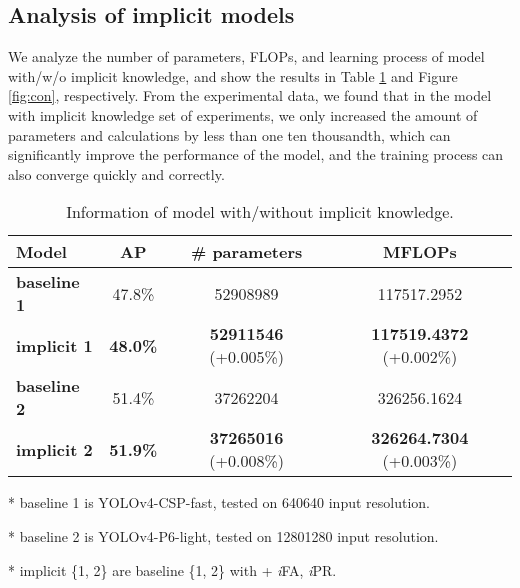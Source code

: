 \documentclass[10pt,twocolumn,letterpaper]{article}
\begin{document}
\subsection{Analysis of implicit models}
\label{sec:an}

We analyze the number of parameters, FLOPs, and learning process of model with/w/o implicit knowledge, and show the results in Table \ref{table:pf} and Figure \ref{fig:con}, respectively. From the experimental data, we found that in the model with implicit knowledge set of experiments, we only increased the amount of parameters and calculations by less than one ten thousandth, which can significantly improve the performance of the model, and the training process can also converge quickly and correctly.

\begin{table}[h]
	\vspace{-2mm}
	\centering
	\begin{threeparttable}[h]
		\footnotesize
		\caption{Information of model with/without implicit knowledge.}
		\label{table:pf}
		\setlength\tabcolsep{3.5pt}
		\begin{tabular}{lccc}
			\toprule
			\textbf{Model} & \textbf{AP} & \textbf{\# parameters} & \textbf{MFLOPs} \\				
			\midrule
			\textbf{baseline 1} & 47.8\% & 52908989 & 117517.2952 \\
			\textbf{implicit 1} & \textbf{48.0\%} & \textbf{52911546} (+0.005\%) & \textbf{117519.4372} (+0.002\%) \\	
			\midrule
			\textbf{baseline 2} & 51.4\% & 37262204 & 326256.1624 \\
			\textbf{implicit 2} & \textbf{51.9\%} & \textbf{37265016} (+0.008\%) & \textbf{326264.7304} (+0.003\%) \\		
			\bottomrule
		\end{tabular}
		\begin{tablenotes}[flushleft]
			\footnotesize
			\item[*] baseline 1 is YOLOv4-CSP-fast, tested on 640640 input resolution.
			\item[*] baseline 2 is YOLOv4-P6-light, tested on 12801280 input resolution.
			\item[*] implicit \{1, 2\} are baseline \{1, 2\} with + \textit{i}FA,  \textit{i}PR.
		\end{tablenotes}
	\end{threeparttable}
    \vspace{-2mm}
\end{table}
\end{document}
